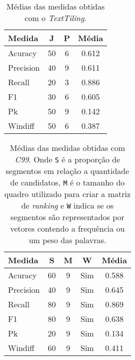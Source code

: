 \begin{table}[!h]
	\centering
	\begin{tabular}{|l|c|c|c|} \hline
		Medida & \textbf{J} & \textbf{P} & \textbf{Média}\\		\hline

		Acuracy		& 50 & 6 & 0.612 \\ \hline	
		Precision	& 40 & 9 & 0.611 \\ \hline			
		Recall		& 20 & 3 & 0.886 \\ \hline		
		F1			& 30 & 6 & 0.605 \\ \hline	
		Pk			& 50 & 9 & 0.142 \\ \hline	
		Windiff		& 50 & 6 & 0.387 \\ \hline		

	\end{tabular}
	\caption{Médias das medidas obtidas com o \textit{TextTiling}.}
	\label{tab:TextTilingSemPreprocess}
\end{table}



\begin{table}[!h]
	\centering

	\begin{tabular}{|l|c|c|c|c|} \hline
		\textbf{Medida} & \textbf{S} & \textbf{M} & \textbf{W} & \textbf{Média}\\	\hline

		Acuracy		& 60 & 9 & Sim & 0.588 \\ \hline
		Precision	& 40 & 9 & Sim & 0.645 \\ \hline
		Recall		& 80 & 9 & Sim & 0.869 \\ \hline
		F1			& 80 & 9 & Sim & 0.638 \\ \hline
		Pk			& 20 & 9 & Sim & 0.134 \\ \hline
		Windiff		& 60 & 9 & Sim & 0.411 \\ \hline
		
	\end{tabular}
	
	\caption{Médias das medidas obtidas com \textit{C99}. Onde \texttt{S} é a proporção de segmentos em relação a quantidade de candidatos, \texttt{M} é o tamanho do quadro utilizado para criar a matriz de \textit{ranking} e \texttt{W} indica se os segmentos são representados por vetores contendo a frequência ou um peso das palavras.}
	\label{tab:C99SemPreprocess}
\end{table}







